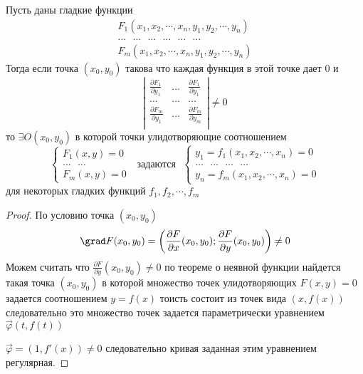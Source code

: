 \begin{theorem}
  Пусть  даны гладкие функции
  $$
  \begin{array}{c}
    F_1 (x_1, x_2, \cdots, x_n, y_1, y_2, \cdots, y_n) \\
    \dots ~~~ \dots ~~~ \dots ~~~ \dots  ~~~ \dots ~~~ \dots \\
    F_m (x_1, x_2, \cdots, x_n, y_1, y_2, \cdots, y_n)
  \end{array}
  $$
  Тогда если точка $(x_0, y_0)$ такова что каждая функция в этой точке дает $0$
  и
  $$
  \left|
  \begin{array}{ccc}
    \frac{\partial F_1}{\partial y_1} & \dots &
    \frac{\partial F_1}{\partial y_1} \\

    \dots & \dots & \dots \\

    \frac{\partial F_m}{\partial y_1} & \dots &
    \frac{\partial F_m}{\partial y_m} \\
  \end{array}
  \right|
  \not= 0
  $$
  то $\exists O(x_0, y_0)$ в которой точки улидотворяющие соотношением
  $$
  \left\{
  \begin{array}{c}
    F_1(x, y) = 0 \\
    \dots ~~~ \dots \\
    F_m(x, y) = 0
  \end{array}
  \right. ~~~ \text{задаются} ~~~
  \left\{
  \begin{array}{c}
    y_1 = f_1(x_1, x_2, \cdots, x_n) = 0 \\
    \dots ~~~ \dots ~~~ \dots ~~~ \dots \\
    y_n = f_m(x_1, x_2, \cdots, x_n) = 0
  \end{array}
  \right.
  $$
  для некоторых гладких функций $f_1, f_2, \cdots, f_m $
\end{theorem}

\begin{proof}
  По условию  точка $(x_0, y_0)$
  $$
  \grad F(x_0, y_0) = \left( \frac{\partial F}{\partial x}(x_0, y_0);
  \frac{\partial F}{\partial y}(x_0, y_0) \right) \not= 0
  $$
  Можем считать что $\frac{\partial F}{\partial y}(x_0, y_0) \not= 0$ по
  теореме о неявной функции найдется такая точка $(x_0, y_0)$ в которой
  множество точек улидотворяющих $F(x, y) = 0$ задается соотношением $y = f(x)$
  тоисть состоит из точек вида $(x, f(x))$ следовательно это множество точек
  задается параметрически уравнением $\vec \varphi (t, f(t))$

  $\vec \varphi = (1, f'(x)) \not= 0$ следовательно кривая заданная этим
  уравнением регулярная.
\end{proof}

